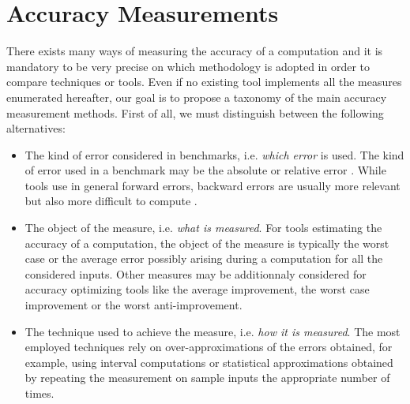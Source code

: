 


\section{Accuracy Measurements}

There exists many ways of measuring the accuracy of a computation and it is mandatory to be very precise
on which methodology is adopted in order to compare techniques or tools. Even if no existing tool 
implements all the measures enumerated hereafter, our goal is to propose a taxonomy of the main accuracy 
measurement methods. First of all, we must distinguish between the following alternatives:
\begin{itemize}
\item The kind of error considered in  benchmarks, i.e. \textit{which error} is used. The kind of error used in a benchmark may be the absolute or relative error \cite{Gol91}. While tools use in general forward errors, 
backward errors are usually more relevant but also more difficult to compute \cite{Chat}.
\item The object of the measure, i.e. \textit{what is measured}. For tools estimating the accuracy of a computation, the object of the measure is typically
the worst case or the average error possibly arising during a computation for all the considered inputs.
Other measures may be additionnaly considered for accuracy optimizing tools like the average improvement,
the worst case improvement or the worst anti-improvement.
\item The technique used to achieve the measure, i.e. \textit{how it is measured}. The most employed techniques rely
on over-approximations of the errors obtained, for example, using interval computations or statistical approximations
obtained by repeating the measurement on sample inputs the appropriate number of times.
\end{itemize}
 
